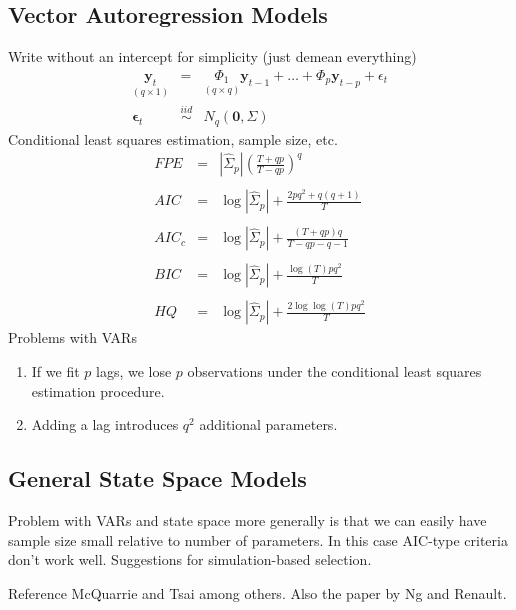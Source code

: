 \documentclass[12pt]{article}
\theoremstyle{definition}
\begin{document}
\subsection{Vector Autoregression Models}
Write without an intercept for simplicity (just demean everything)
	\begin{eqnarray*}
		\underset{(q\times 1)}{\textbf{y}_t} &=& \underset{(q\times q)}{\Phi_1} \textbf{y}_{t-1} + \hdots + \Phi_{p}\textbf{y}_{t-p} + \epsilon_t\\
		\boldsymbol{\epsilon}_t &\overset{iid}{\sim}& N_q(\mathbf{0}, \Sigma)
	\end{eqnarray*}
Conditional least squares estimation, sample size, etc.	
\begin{eqnarray*}
	FPE &=& \left| \widehat{\Sigma}_p \right| \left( \frac{T + qp}{T - qp}\right)^q\\ \\
	AIC &=& \log \left| \widehat{\Sigma}_p\right| + \frac{2pq^2 + q(q+1)}{T}\\ \\ 
	AIC_c &=& \log \left| \widehat{\Sigma}_p\right|  + \frac{(T + qp)q}{T - qp - q -1}\\ \\
	BIC &=& \log \left| \widehat{\Sigma}_p\right| +  \frac{\log(T)pq^2}{T}\\ \\ 
	HQ &=& \log \left| \widehat{\Sigma}_p\right| +  \frac{2 \log\log(T)pq^2}{T}
\end{eqnarray*}
Problems with VARs
	\begin{enumerate}
		\item If we fit $p$ lags, we lose $p$ observations under the conditional least squares estimation procedure.
		\item Adding a lag introduces $q^2$ additional parameters. 
	\end{enumerate}

\subsection{General State Space Models}
Problem with VARs and state space more generally is that we can easily have sample size small relative to number of parameters. In this case AIC-type criteria don't work well. Suggestions for simulation-based selection.


Reference McQuarrie and Tsai among others. Also the paper by Ng and Renault. 

\newpage
\end{document}
